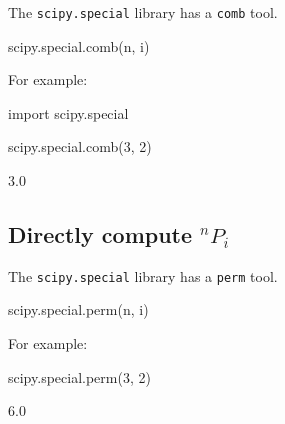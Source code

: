 The \texttt{scipy.special} library has a \texttt{comb} tool.


\begin{api}
scipy.special.comb(n, i)
\end{api}



For example:




\begin{pyin}
import scipy.special

scipy.special.comb(3, 2)
\end{pyin}





\begin{raw}
3.0
\end{raw}





\subsection{Directly compute \(^n P_i\)}
\label{\detokenize{tools-for-mathematics/05-combinations-permutations/how/main:directly-computing-n-p-i}}

The \texttt{scipy.special} library has a \texttt{perm} tool.


\begin{api}
scipy.special.perm(n, i)
\end{api}

For example:

\begin{pyin}
scipy.special.perm(3, 2)
\end{pyin}





\begin{raw}
6.0
\end{raw}







